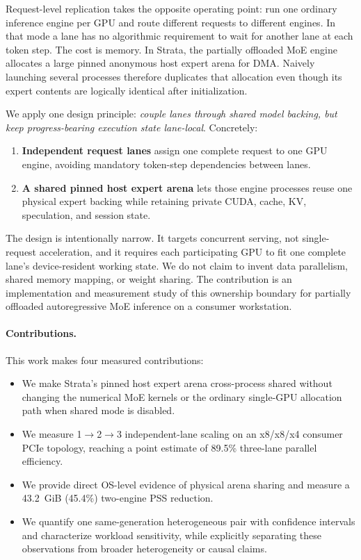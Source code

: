 Request-level replication takes the opposite operating point: run one ordinary inference engine per GPU and route different requests to different engines. In that mode a lane has no algorithmic requirement to wait for another lane at each token step. The cost is memory. In Strata, the partially offloaded MoE engine allocates a large pinned anonymous host expert arena for DMA. Naively launching several processes therefore duplicates that allocation even though its expert contents are logically identical after initialization.

We apply one design principle: \emph{couple lanes through shared model backing, but keep progress-bearing execution state lane-local}. Concretely:
\begin{enumerate}
    \item \textbf{Independent request lanes} assign one complete request to one GPU engine, avoiding mandatory token-step dependencies between lanes.
    \item \textbf{A shared pinned host expert arena} lets those engine processes reuse one physical expert backing while retaining private CUDA, cache, KV, speculation, and session state.
\end{enumerate}

The design is intentionally narrow. It targets concurrent serving, not single-request acceleration, and it requires each participating GPU to fit one complete lane's device-resident working state. We do not claim to invent data parallelism, shared memory mapping, or weight sharing. The contribution is an implementation and measurement study of this ownership boundary for partially offloaded autoregressive MoE inference on a consumer workstation.

\paragraph{Contributions.}
This work makes four measured contributions:
\begin{itemize}
    \item We make Strata's pinned host expert arena cross-process shared without changing the numerical MoE kernels or the ordinary single-GPU allocation path when shared mode is disabled.
    \item We measure 1$\rightarrow$2$\rightarrow$3 independent-lane scaling on an x8/x8/x4 consumer PCIe topology, reaching a point estimate of 89.5\% three-lane parallel efficiency.
    \item We provide direct OS-level evidence of physical arena sharing and measure a 43.2~GiB (45.4\%) two-engine PSS reduction.
    \item We quantify one same-generation heterogeneous pair with confidence intervals and characterize workload sensitivity, while explicitly separating these observations from broader heterogeneity or causal claims.
\end{itemize}

